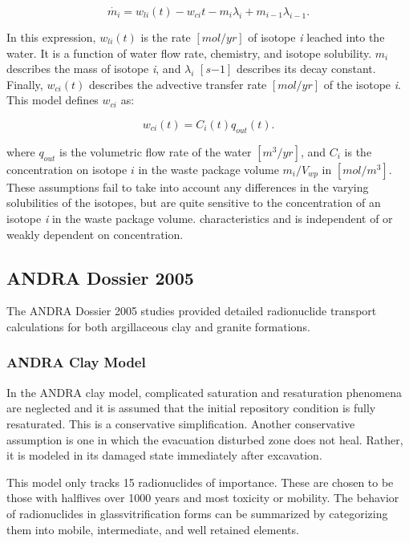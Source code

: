 {\begin{equation}
\dot{m_i}=w_{li}(t)-w_{ci}{t}-m_i\lambda_i+m_{i-1}\lambda_{i-1}.\nonumber
\end{equation}

In this expression, $w_{li}(t)$ is the rate $[mol/yr]$ of isotope \emph{i}
leached into the water.  It is a function of water flow rate, chemistry, and
isotope solubility. $m_i$ describes the mass of isotope \emph{i}, and
$\lambda_i$ $[s{-1}]$ describes its decay constant. Finally, $w_{ci}(t)$
describes the advective transfer rate $[mol/yr]$ of the isotope \emph{i}. This 
model defines $w_{ci}$ as:

\begin{equation}
  w_{ci}(t)=C_i(t)q_{out}(t). 
\end{equation}

where $q_{out}$ is the volumetric flow rate of the water $[m^3/yr]$, and 
$C_i$ is the concentration on isotope $i$ in the waste package volume 
$m_i/V_{wp}$ in $[mol/m^3]$. These assumptions fail to take into account any
differences in the varying solubilities of the isotopes, but are quite
sensitive to the concentration of an isotope \emph{i} in the waste package
volume.  
characteristics and is independent of or weakly dependent on concentration. 
\cite{li_methodology_2006}

\subsection{ANDRA Dossier 2005} The ANDRA Dossier 2005 studies provided
detailed radionuclide transport calculations for both argillaceous clay and granite
formations. 

\subsubsection{ANDRA Clay Model} 

In the \gls{ANDRA} clay model, complicated saturation and resaturation phenomena 
are neglected and it is assumed that the initial repository condition is fully
resaturated. This is a conservative simplification. Another conservative
assumption is one in which the evacuation disturbed zone does not heal. Rather,
it is modeled in its damaged state immediately after excavation. 

This model only tracks 15 radionuclides of importance.  These are chosen to be those
with halflives over 1000 years and most toxicity or mobility.
\cite{andra_argile:_2005} The behavior of radionuclides in 
glassvitrification forms can be summarized by categorizing them into mobile,
intermediate, and well retained elements. 

}
